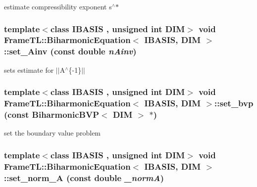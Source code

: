 estimate compressibility exponent s$^\wedge$$\ast$ \hypertarget{classFrameTL_1_1BiharmonicEquation_390c7b64b0183610aede9842c805804e}{
\subsubsection[{set\_\-Ainv}]{\setlength{\rightskip}{0pt plus 5cm}template$<$class IBASIS , unsigned int DIM$>$ void {\bf FrameTL::BiharmonicEquation}$<$ IBASIS, DIM $>$::set\_\-Ainv (const double {\em nAinv})}}
\label{classFrameTL_1_1BiharmonicEquation_390c7b64b0183610aede9842c805804e}


sets estimate for $|$$|$A$^\wedge$\{-1\}$|$$|$ \hypertarget{classFrameTL_1_1BiharmonicEquation_cf2416d4c035dbe3edf426d8ca032c0f}{
\subsubsection[{set\_\-bvp}]{\setlength{\rightskip}{0pt plus 5cm}template$<$class IBASIS , unsigned int DIM$>$ void {\bf FrameTL::BiharmonicEquation}$<$ IBASIS, DIM $>$::set\_\-bvp (const BiharmonicBVP$<$ DIM $>$ $\ast$)}}
\label{classFrameTL_1_1BiharmonicEquation_cf2416d4c035dbe3edf426d8ca032c0f}


set the boundary value problem \hypertarget{classFrameTL_1_1BiharmonicEquation_731c3491306a23684256fe4dede66b53}{
\subsubsection[{set\_\-norm\_\-A}]{\setlength{\rightskip}{0pt plus 5cm}template$<$class IBASIS , unsigned int DIM$>$ void {\bf FrameTL::BiharmonicEquation}$<$ IBASIS, DIM $>$::set\_\-norm\_\-A (const double {\em \_\-normA})}}
\label{classFrameTL_1_1BiharmonicEquation_731c3491306a23684256fe4dede66b53}


